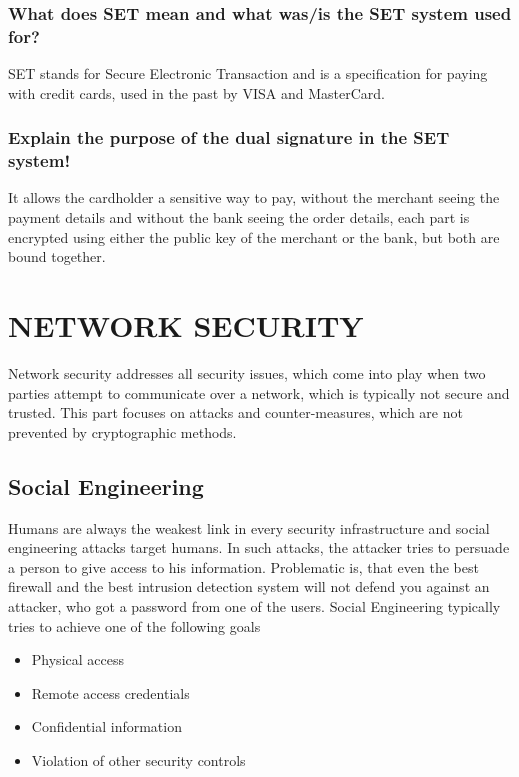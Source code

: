\documentclass[a4paper, 10 pt, conference]{ieeeconf}
\begin{document}
\subsubsection{\textbf{What does SET mean and what was/is the SET system used for?}}
SET stands for Secure Electronic Transaction and is a specification for paying with credit cards, used in the past by VISA and MasterCard.
\subsubsection{\textbf{Explain the purpose of the dual signature in the SET system!}}
It allows the cardholder a sensitive way to pay, without the merchant seeing the payment details and without the bank seeing the order details, each part is encrypted using either the public key of the merchant or the bank, but both are bound together. 


\pagebreak







\section{\textbf{NETWORK SECURITY}}

Network security addresses all security issues, which come into play when two parties attempt to communicate over a network, which is typically not secure and trusted. This part focuses on attacks and counter-measures, which are not prevented by cryptographic methods. 

\subsection{\textbf{Social Engineering}}
Humans are always the weakest link in every security infrastructure and social engineering attacks target humans. In such attacks, the attacker tries to persuade a person to give access to his information. 
Problematic is, that even the best firewall and the best intrusion detection system will not defend you against an attacker, who got a password from one of the users. 
Social Engineering typically tries to achieve one of the following goals
\begin{itemize}
\item Physical access
\item Remote access credentials
\item Confidential information
\item Violation of other security controls
\end{itemize}
\end{document}
